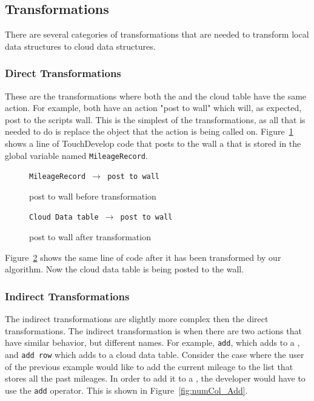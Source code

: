 \documentclass{sigplanconf}
\begin{document}
\subsection{Transformations}
\label{sec:transformations}

There are several categories of transformations that are needed to transform local data structures to cloud data structures.  


\subsubsection{Direct Transformations}
These are the transformations where both the \NC{} and the cloud table have the same action.  For example, both have an action "post to wall" which will, as expected, post to the scripts wall.  This is the simplest of the transformations, as all that is needed to do is replace the object that the action is being called on.  Figure~\ref{fig:numCol_postToWall} shows a line of TouchDevelop code that posts to the wall a \NC{} that is stored in the global variable named \texttt{MileageRecord}.


\begin{figure}[htbp!]
\begin{center}
\texttt{MileageRecord $\rightarrow$ post to wall}

\end{center}
\nocaptionrule
\caption{post to wall before transformation}
\label{fig:numCol_postToWall}
\end{figure}

\begin{figure}[htbp!]
\begin{center}
\texttt{Cloud Data table $\rightarrow$ post to wall}
\nocaptionrule
\caption{post to wall after transformation}
\label{fig:CloudTable_postToWall}
\end{center}
\end{figure}

Figure~\ref{fig:CloudTable_postToWall}  shows the same line of code after it has been transformed by our algorithm.  Now the cloud data table is being posted to the wall.




\subsubsection{Indirect Transformations}
The indirect transformations are slightly more complex then the direct transformations.  The indirect transformation is when there are two actions that have similar behavior, but different names.  For example, \texttt{add}, which adds to a \NC{}, and \texttt{add row} which adds to a cloud data table.  Consider the case where the user of the previous example would like to add the current mileage to the list that stores all the past mileages.  In order to add it to a \NC{}, the developer would have to use the \texttt{add} operator.  This is shown in Figure~\ref{fig:numCol_Add}.
\end{document}
